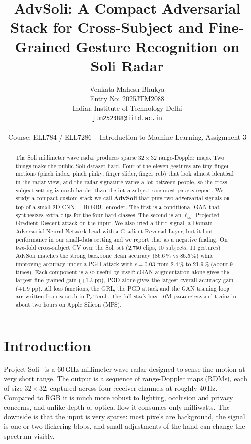 \documentclass[10pt,twocolumn,letterpaper]{article}
\title{AdvSoli: A Compact Adversarial Stack for Cross-Subject and Fine-Grained Gesture Recognition on Soli Radar}
\author{Venkata Mahesh Bhukya\\
Entry No: 2025JTM2088\\
Indian Institute of Technology Delhi\\
{\tt\small jtm252088@iitd.ac.in}\\
\\
Course: ELL784 / ELL7286 -- Introduction to Machine Learning, Assignment 3
}
\begin{document}
\maketitle

\begin{abstract}
The Soli millimeter wave radar produces sparse $32\times32$ range-Doppler
maps. Two things make the public Soli dataset hard. Four of the eleven
gestures are tiny finger motions (pinch index, pinch pinky, finger
slider, finger rub) that look almost identical in the radar view, and
the radar signature varies a lot between people, so the cross-subject
setting is much harder than the intra-subject one most papers report.
We study a compact custom stack we call \textbf{AdvSoli} that puts two
adversarial signals on top of a small 2D-CNN + Bi-GRU encoder. The first
is a conditional GAN that synthesizes extra clips for the four hard
classes. The second is an $\ell_\infty$ Projected Gradient Descent
attack on the input. We also tried a third signal, a Domain Adversarial
Neural Network head with a Gradient Reversal Layer, but it hurt
performance in our small-data setting and we report that as a negative
finding. On two-fold cross-subject CV over the Soli set (2,750 clips,
10 subjects, 11 gestures) AdvSoli matches the strong backbone clean
accuracy (86.6\,\% vs 86.5\,\%) while improving accuracy under a PGD
attack with $\epsilon{=}0.03$ from 2.4\,\% to 21.9\,\% (about 9 times).
Each component is also useful by itself: cGAN augmentation alone gives
the largest fine-grained gain (+1.3 pp), PGD alone gives the largest
overall accuracy gain (+1.9 pp). All loss functions, the GRL, the PGD
attack and the GAN training loop are written from scratch in PyTorch.
The full stack has 1.6M parameters and trains in about two hours on
Apple Silicon (MPS).
\end{abstract}

\section{Introduction}
\label{sec:intro}

Project Soli~\cite{lien2016soli} is a 60\,GHz millimeter wave radar
designed to sense fine motion at very short range. The output is a
sequence of range-Doppler maps (RDMs), each of size $32\times32$, captured
across four receiver channels at roughly 40\,Hz. Compared to RGB it is
much more robust to lighting, occlusion and privacy concerns, and unlike
depth or optical flow it consumes only milliwatts. The downside is that
the input is very sparse: most pixels are background, the signal is one
or two flickering blobs, and small adjustments of the hand can change
the spectrum visibly.
\end{document}
